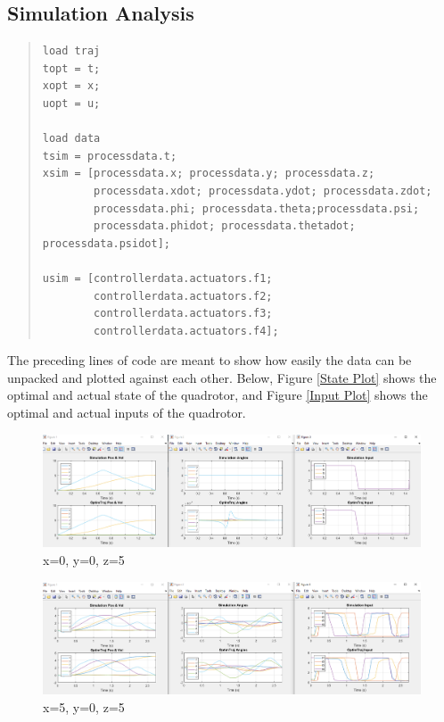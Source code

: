 \documentclass[12pt]{article}
\begin{document}
\subsection{Simulation Analysis}

\begin{quote}
\begin{lstlisting}
load traj
topt = t;
xopt = x;
uopt = u;

load data
tsim = processdata.t;
xsim = [processdata.x; processdata.y; processdata.z;
        processdata.xdot; processdata.ydot; processdata.zdot; 
        processdata.phi; processdata.theta;processdata.psi;
        processdata.phidot; processdata.thetadot; processdata.psidot];
    
usim = [controllerdata.actuators.f1; 
        controllerdata.actuators.f2;
        controllerdata.actuators.f3;
        controllerdata.actuators.f4];
\end{lstlisting}
\end{quote}
The preceding lines of code are meant to show how easily the data can be unpacked and plotted against each other. Below, Figure \ref{State Plot} shows the optimal and actual state of the quadrotor, and Figure \ref{Input Plot} shows the optimal and actual inputs of the quadrotor.
\newline
\newline


\begin{figure}[H]
\centerline{\includegraphics[scale=0.45]{0_0_5.PNG}}
  \caption{\label{0_0_5} x=0, y=0, z=5}
  \label{fig}
\end{figure}

\begin{figure}[H]
\centerline{\includegraphics[scale=0.45]{5_0_5.PNG}}
  \caption{\label{5_0_5} x=5, y=0, z=5}
  \label{fig}
\end{figure}
\end{document}
